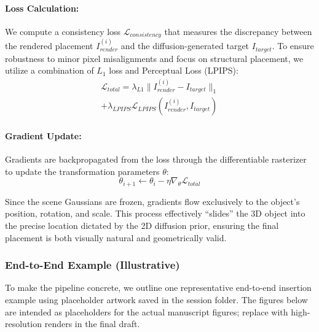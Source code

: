 \documentclass[pdflatex,sn-mathphys-num]{sn-jnl}%
\theoremstyle{thmstyleone}%
\theoremstyle{thmstyletwo}%
\theoremstyle{thmstylethree}%
\begin{document}
\paragraph{Loss Calculation:}
We compute a consistency loss $\mathcal{L}_{consistency}$ that measures the discrepancy between the rendered placement $I_{render}^{(i)}$ and the diffusion-generated target $I_{target}$. To ensure robustness to minor pixel misalignments and focus on structural placement, we utilize a combination of $L_1$ loss and Perceptual Loss (LPIPS):
\begin{equation}
\begin{split}
    \mathcal{L}_{total} = \lambda_{L1} \| I_{render}^{(i)} - I_{target} \|_1 \\
    + \lambda_{LPIPS} \mathcal{L}_{LPIPS}(I_{render}^{(i)}, I_{target})
\end{split}
\label{eq:loss}
\end{equation}

\paragraph{Gradient Update:}
Gradients are backpropagated from the loss through the differentiable rasterizer to update the transformation parameters $\theta$:
\[
\theta_{i+1} \leftarrow \theta_i - \eta \nabla_{\theta} \mathcal{L}_{total}
\]

Since the scene Gaussians are frozen, gradients flow exclusively to the object's position, rotation, and scale. This process effectively ``slides'' the 3D object into the precise location dictated by the 2D diffusion prior, ensuring the final placement is both visually natural and geometrically valid.

\subsubsection{End-to-End Example (Illustrative)}
To make the pipeline concrete, we outline one representative end-to-end insertion example using placeholder artwork saved in the session folder. The figures below are intended as placeholders for the actual manuscript figures; replace with high-resolution renders in the final draft.
\end{document}
